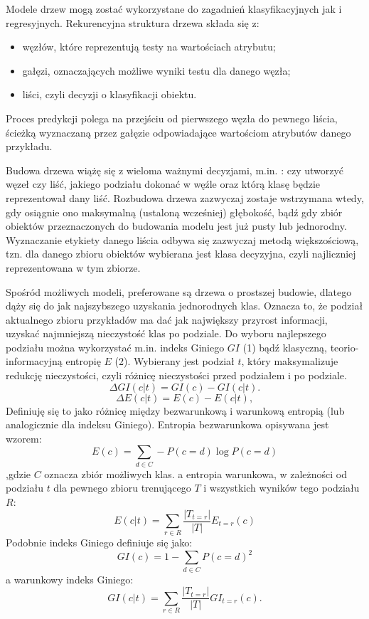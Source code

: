 Modele drzew mogą zostać wykorzystane do zagadnień klasyfikacyjnych jak i regresyjnych.
Rekurencyjna struktura drzewa składa się z:
\begin{itemize}
    \item węzłów, które reprezentują testy na wartościach atrybutu;
    \item gałęzi, oznaczających możliwe wyniki testu dla danego węzła;
    \item liści, czyli decyzji o klasyfikacji obiektu.
\end{itemize}
Proces predykcji polega na przejściu od pierwszego węzła do pewnego liścia, ścieżką wyznaczaną przez gałęzie odpowiadające wartościom atrybutów danego przykładu.

Budowa drzewa wiążę się z wieloma ważnymi decyzjami, m.in. : czy utworzyć węzeł czy liść,  jakiego podziału dokonać w węźle oraz którą klasę będzie reprezentował dany liść. Rozbudowa drzewa zazwyczaj zostaje wstrzymana wtedy, gdy osiągnie ono maksymalną (ustaloną wcześniej) głębokość, bądź gdy zbiór obiektów przeznaczonych do budowania modelu jest już pusty lub jednorodny. Wyznaczanie etykiety danego liścia odbywa się zazwyczaj metodą większościową, tzn.  dla danego zbioru obiektów wybierana jest klasa
decyzyjna, czyli najliczniej reprezentowana w tym zbiorze.

Spośród możliwych modeli, preferowane są drzewa o prostszej budowie, dlatego dąży się do jak najszybszego uzyskania jednorodnych klas. Oznacza to, że podział aktualnego zbioru przykładów ma dać jak największy przyrost informacji, uzyskać najmniejszą nieczystość
klas po podziale. Do wyboru najlepszego podziału można wykorzystać m.in. indeks Giniego $GI$ (1) bądź klasyczną, teorio-informacyjną entropię $E$ (2). Wybierany jest podział $t$, który maksymalizuje redukcję nieczystości, czyli
różnicę nieczystości przed podziałem i po podziale.
\begin{equation}
 \Delta GI(c|t) = GI(c)-GI(c|t).      
 \end{equation}
 \begin{equation}
    \Delta E(c|t) = E(c)-E(c|t),
\end{equation}
Definiuję się to jako różnicę między bezwarunkową i warunkową entropią (lub
analogicznie dla indeksu Giniego).
Entropia bezwarunkowa opisywana jest wzorem:
\begin{equation}
    E(c) = \sum_{d\in C} - P(c=d)\log P(c=d)
\end{equation}
,gdzie $C$ oznacza zbiór możliwych klas.
a entropia warunkowa, w zależności od podziału $t$ dla pewnego zbioru trenującego $T$ i wszystkich wyników tego podziału $R$:
\begin{equation}
    E(c|t) = \sum_{r\in R} \frac{|T_{t=r}|}{|T|}E_{t=r}(c)
\end{equation}
Podobnie indeks Giniego definiuje się jako:
\begin{equation}
    GI(c) = 1- \sum_{d\in C}P(c=d)^2
\end{equation}
a warunkowy indeks Giniego:
\begin{equation}
      GI(c|t) = \sum_{r\in R} \frac{|T_{t=r}|}{|T|}GI_{t=r}(c).
\end{equation}

